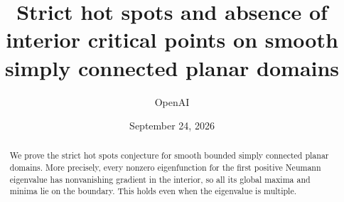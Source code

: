 \documentclass[11pt]{article}
\title{Strict hot spots and absence of interior critical points on smooth simply connected planar domains}
\author{OpenAI}
\date{September 24, 2026}
\numberwithin{equation}{section}
\theoremstyle{remark}
\begin{document}
\maketitle
\begin{abstract}
We prove the strict hot spots conjecture for smooth bounded simply connected planar domains. More precisely, every nonzero eigenfunction for the first positive Neumann eigenvalue has nonvanishing gradient in the interior, so all its global maxima and minima lie on the boundary. This holds even when the eigenvalue is multiple.
\end{abstract}








\end{document}
